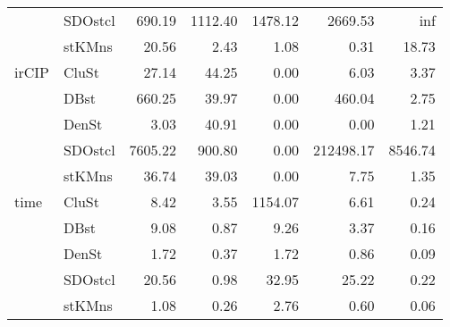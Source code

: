 \begin{table}
\begin{tabular}{llrrrrr}
     & SDOstcl &         690.19 &      1112.40 & 1478.12 &    2669.53 &     inf \\
     & stKMns &          20.56 &         2.43 &    1.08 &       0.31 &   18.73 \\
irCIP & CluSt &          27.14 &        44.25 &    0.00 &       6.03 &    3.37 \\
     & DBst &         660.25 &        39.97 &    0.00 &     460.04 &    2.75 \\
     & DenSt &           3.03 &        40.91 &    0.00 &       0.00 &    1.21 \\
     & SDOstcl &        7605.22 &       900.80 &    0.00 &  212498.17 & 8546.74 \\
     & stKMns &          36.74 &        39.03 &    0.00 &       7.75 &    1.35 \\
time & CluSt &           8.42 &         3.55 & 1154.07 &       6.61 &    0.24 \\
     & DBst &           9.08 &         0.87 &    9.26 &       3.37 &    0.16 \\
     & DenSt &           1.72 &         0.37 &    1.72 &       0.86 &    0.09 \\
     & SDOstcl &          20.56 &         0.98 &   32.95 &      25.22 &    0.22 \\
     & stKMns &           1.08 &         0.26 &    2.76 &       0.60 &    0.06 \\
\bottomrule
\end{tabular}
\end{table}
